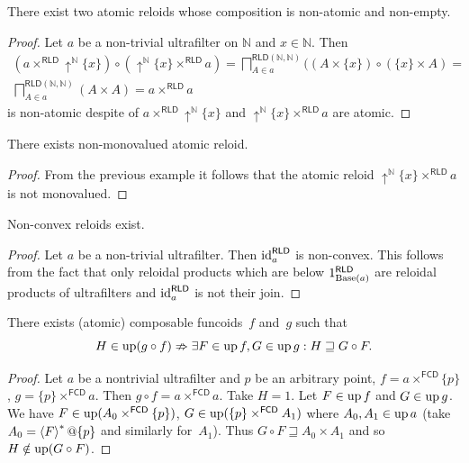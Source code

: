 \begin{example}
There exist two atomic reloids whose composition is non-atomic and
non-empty.\end{example}
\begin{proof}
Let $a$ be a non-trivial ultrafilter on $\mathbb{N}$ and $x\in\mathbb{N}$.
Then
\begin{multline*}
(a\times^{\mathsf{RLD}}\uparrow^{\mathbb{N}}\{x\})\circ(\uparrow^{\mathbb{N}}\{x\}\times^{\mathsf{RLD}}a)=\bigsqcap_{A\in a}^{\mathsf{RLD}(\mathbb{N},\mathbb{N})}((A\times\{x\})\circ(\{x\}\times A)=\\
\bigsqcap_{A\in a}^{\mathsf{RLD}(\mathbb{N},\mathbb{N})}(A\times A)=a\times^{\mathsf{RLD}}a
\end{multline*}
is non-atomic despite of $a\times^{\mathsf{RLD}}\uparrow^{\mathbb{N}}\{x\}$
and $\uparrow^{\mathbb{N}}\{x\}\times^{\mathsf{RLD}}a$ are atomic.\end{proof}
\begin{example}
There exists non-monovalued atomic reloid.\end{example}
\begin{proof}
From the previous example it follows that the atomic reloid $\uparrow^{\mathbb{N}}\{x\}\times^{\mathsf{RLD}}a$
is not monovalued.\end{proof}
\begin{example}
Non-convex reloids exist.\end{example}
\begin{proof}
Let $a$ be a non-trivial ultrafilter. Then ${\operatorname{id}}_{a}^{\mathsf{RLD}}$
is non-convex. This follows from the fact that only reloidal products
which are below $1_{\operatorname{Base}(a)}^{\mathsf{RLD}}$ are reloidal products
of ultrafilters and ${\operatorname{id}}_{a}^{\mathsf{RLD}}$ is not their join.\end{proof}

\begin{example}\label{fcd-comp-ent}
There exists (atomic) composable funcoids~$f$ and~$g$ such that
\[ H\in\operatorname{up}(g\circ f)\nRightarrow \exists F\in\operatorname{up} f,G\in\operatorname{up} g: H\sqsupseteq G\circ F. \]
\end{example}

\begin{proof}
Let $a$ be a nontrivial ultrafilter and $p$ be an arbitrary point, $f = a
\times^{\mathsf{FCD}} \{ p \}$, $g = \{ p \}
\times^{\mathsf{FCD}} a$. Then $g \circ f = a
\times^{\mathsf{FCD}} a$. Take $H = 1$. Let $F\in\operatorname{up} f$ and $G\in\operatorname{up} g$. We have $F \in \operatorname{up} (A_0
\times^{\mathsf{FCD}} \{ p \})$, $G \in \operatorname{up} (\{ p \}
\times^{\mathsf{FCD}} A_1)$ where $A_0, A_1 \in \operatorname{up} a$ (take $A_0=\left\langle F\right\rangle ^{\ast}@\{p\}$ and similarly for~$A_1$). Thus $G
\circ F \sqsupseteq A_0 \times A_1$ and so $H \notin \operatorname{up} (G \circ F)$.
\end{proof}

